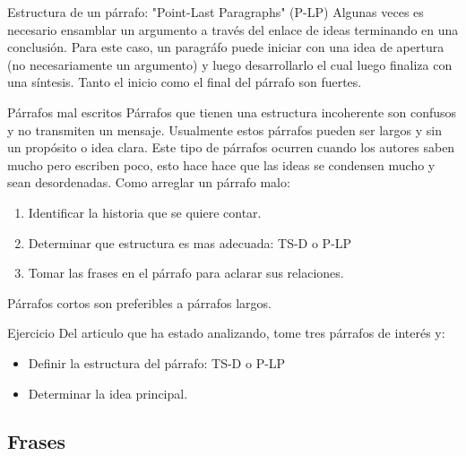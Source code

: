 \documentclass[
10pt,
aspectratio=169,
]{beamer}
\begin{document}
\begin{frame}[c]{Estructura de un p\'arrafo: \alert{"Point-Last Paragraphs" (P-LP)}}
Algunas veces es necesario ensamblar un argumento a trav\'es del enlace de ideas terminando en una conclusi\'on. Para este caso, un paragr\'afo puede iniciar con una idea de apertura (no necesariamente un argumento) y luego desarrollarlo el cual luego finaliza con una s\'intesis. Tanto el inicio como el final del p\'arrafo son fuertes. 
\end{frame}

\begin{frame}[c]{P\'arrafos mal escritos}
P\'arrafos que tienen una estructura incoherente son confusos y no transmiten un mensaje. Usualmente estos p\'arrafos pueden ser largos y sin un prop\'osito o idea clara. Este tipo de p\'arrafos ocurren cuando los autores saben mucho pero escriben poco, esto hace hace que las ideas se condensen mucho y sean desordenadas. 
Como arreglar un p\'arrafo malo:
\begin{enumerate}  
\item Identificar la historia que se quiere contar. 
\item Determinar que estructura es mas adecuada: TS-D o P-LP
\item Tomar las frases en el p\'arrafo para aclarar sus relaciones. 
\end{enumerate}  
P\'arrafos cortos son preferibles a p\'arrafos largos.
\end{frame}

\begin{frame}[c]{Ejercicio}
Del articulo que ha estado analizando, tome tres p\'arrafos de inter\'es y:
\begin{itemize}
\item Definir la estructura del p\'arrafo: TS-D o P-LP
\item Determinar la idea principal.
\end{itemize}
\end{frame}

\subsection{Frases}
\end{document}

